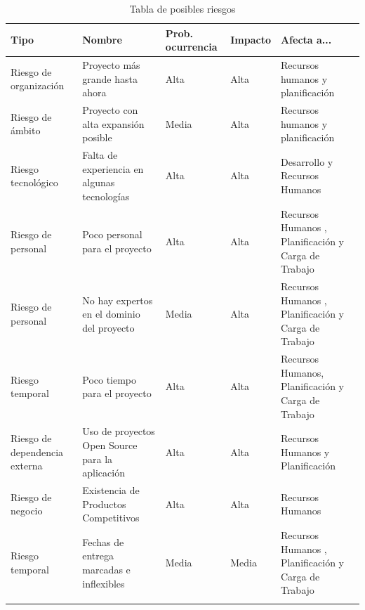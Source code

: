 \begin{center}
	\begin{xltabular}{\textwidth}{|X|X|X|X|X|}
		\hline
		{}\textbf{Tipo} & {}\textbf{Nombre} & {}\textbf{Prob. ocurrencia} & {}\textbf{Impacto} & {}\textbf{Afecta a...} \\
		\hline
		Riesgo de organización & Proyecto más grande hasta ahora & Alta & Alta & Recursos humanos y planificación \\
		\hline
		Riesgo de ámbito & Proyecto con alta expansión posible & Media & Alta & Recursos humanos y planificación \\
		\hline
		Riesgo tecnológico & Falta de experiencia en algunas tecnologías & Alta & Alta & Desarrollo y Recursos Humanos \\
		\hline
		Riesgo de personal & Poco personal para el proyecto & Alta & Alta & Recursos Humanos , Planificación y Carga de Trabajo \\
		\hline
		Riesgo de personal & No hay expertos en el dominio del proyecto & Media & Alta & Recursos Humanos , Planificación y Carga de Trabajo \\
		\hline
		Riesgo temporal & Poco tiempo para el proyecto & Alta & Alta & Recursos Humanos, Planificación y Carga de Trabajo\\
		\hline
		Riesgo de dependencia externa & Uso de proyectos Open Source para la aplicación & Alta & Alta & Recursos Humanos y Planificación \\
		\hline
		Riesgo de negocio & Existencia de Productos Competitivos  & Alta & Alta & Recursos Humanos \\
		\hline
		Riesgo temporal & Fechas de entrega marcadas e inflexibles & Media & Media & Recursos Humanos , Planificación y Carga de Trabajo \\
		\hline
		
		\caption{Tabla de posibles riesgos}
	\end{xltabular}
\end{center}

\newpage

